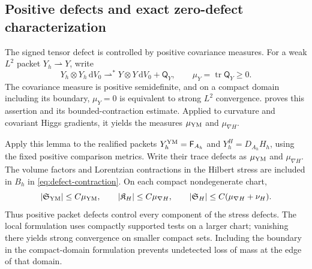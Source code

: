 \documentclass[11pt]{article}
\numberwithin{equation}{section}
\theoremstyle{definition}
\theoremstyle{remark}
\newcommand{\dd}{\mathrm d}
\newcommand{\Fcurv}{\mathsf F}
\newcommand{\dV}{\dd V}
\begin{document}
\subsection{Positive defects and exact zero-defect characterization}
\label{subsec:positive-defects}

The signed tensor defect is controlled by positive covariance measures.
For a weak $L^2$ packet $Y_h\rightharpoonup Y$, write
\[
 Y_h\otimes Y_h\,\dV_0\rightharpoonup^*
 Y\otimes Y\,\dV_0+\mathsf Q_Y,
 \qquad \mu_Y=\operatorname{tr}\mathsf Q_Y\ge0.
\]
The covariance measure is positive semidefinite, and on a compact domain
including its boundary, $\mu_Y=0$ is equivalent to strong $L^2$ convergence.
 proves this assertion and its
bounded-contraction estimate. Applied to curvature and covariant Higgs
gradients, it yields the measures $\mu_{\rm YM}$ and $\mu_{\nabla H}$.

Apply this lemma to the realified packets
$Y_h^{\rm YM}=\Fcurv_{A_h}$ and $Y_h^H=D_{A_h}H_h$, using the fixed
positive comparison metrics.  Write their trace defects as
$\mu_{\rm YM}$ and $\mu_{\nabla H}$.  The volume factors and Lorentzian
contractions in the Hilbert stress are included in $B_h$ in
\eqref{eq:defect-contraction}.  On each compact nondegenerate chart,
\begin{equation}
 |\mathfrak S_{\rm YM}|\le C\mu_{\rm YM},\qquad
 |\mathfrak K_H|\le C\mu_{\nabla H},\qquad
 |\mathfrak S_H|\le C(\mu_{\nabla H}+\nu_H).
 \label{eq:stress-defect-domination}
\end{equation}
Thus positive packet defects control every component of the stress defects.
The local formulation uses compactly supported tests on a larger chart;
vanishing there yields strong convergence on smaller compact sets.  Including
the boundary in the compact-domain formulation prevents undetected loss of
mass at the edge of that domain.
\end{document}
